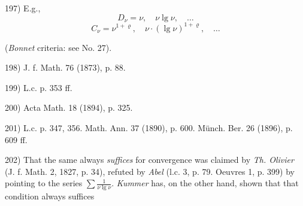 \vfill
\leftline{\rule{2in}{0.4pt}}
\vspace{0.2cm}
{
\footnotesize
197) E.g., 
$$ D_\nu = \nu , \quad \nu \lg \nu , \quad \ldots $$ 
$$ C_\nu = \nu^{1+\varrho}, \quad \nu \cdot (\lg \nu)^{1+\varrho} , \quad \ldots$$ 

(\textit{Bonnet} criteria: see No. 27).

198) J. f. Math. 76 (1873), p. 88.

199) L.c. p. 353 ff.

200) Acta Math. 18 (1894), p. 325.

201) L.c. p. 347, 356. Math. Ann. 37 (1890), p. 600. Münch. Ber. 26 (1896), p. 609 ff.

202) That the same always \textit{suffices} for convergence was claimed by \textit{Th. Olivier} (J. f. Math. 2, 1827, p. 34), refuted by \textit{Abel} (l.c. 3, p. 79. Oeuvres 1, p. 399) by pointing to the series $\sum \frac{1}{\nu \lg \nu}$. \textit{Kummer} has, on the other hand, shown that that condition always suffices

}
